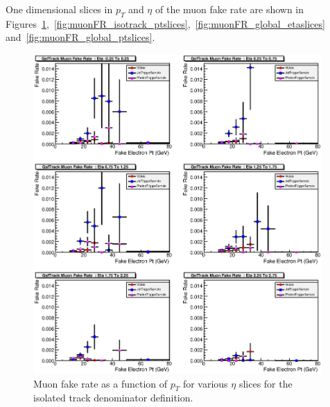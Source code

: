 \documentclass{cmspaper}
\begin{document}
\clearpage
{}
\label{appendix:muonfakerates}

One dimensional slices in $p_T$ and $\eta$ of the muon fake rate are shown in Figures~\ref{fig:muonFR_isotrack_etaslices},~\ref{fig:muonFR_isotrack_ptslices},~\ref{fig:muonFR_global_etaslices} and~\ref{fig:muonFR_global_ptslices}.

\begin{figure}[htb]
\begin{center}
\includegraphics[width=0.98\textwidth]{plots/IsoTrackMuonFakeRateEtaSlices.eps}
   \caption{Muon fake rate as a function of $p_T$ for various $\eta$ slices for the isolated track denominator definition. }
   \label{fig:muonFR_isotrack_etaslices}
\end{center}
\end{figure}
\end{document}
